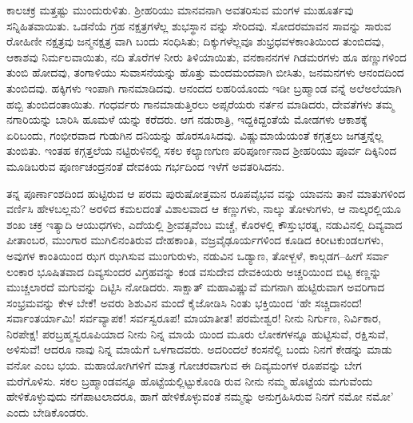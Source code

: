 ಕಾಲಚಕ್ರ ಮತ್ತಷ್ಟು ಮುಂದುರುಳಿತು. ಶ್ರೀಹರಿಯು ಮಾನವನಾಗಿ ಅವತರಿಸುವ ಮಂಗಳ ಮುಹೂರ್ತವು ಸನ್ನಿಹಿತವಾಯಿತು. ಒಡನೆಯೆ ಗ್ರಹ ನಕ್ಷತ್ರಗಳೆಲ್ಲ ಶುಭಸ್ಥಾನ ವನ್ನು ಸೇರಿದವು. ಸೋದರಮಾವನ ಸಾವನ್ನು ಸಾರುವ ರೋಹಿಣೀ ನಕ್ಷತ್ರವು ಜನ್ಮನಕ್ಷತ್ರ ವಾಗಿ ಬಂದು ಸಂಧಿಸಿತು; ದಿಕ್ಕುಗಳೆಲ್ಲವೂ ಶುಭ್ರಧವಳಕಾಂತಿಯಿಂದ ತುಂಬಿದವು, ಆಕಾಶವು ನಿರ್ಮಲವಾಯಿತು, ನದಿ ತೊರೆಗಳ ನೀರು ತಿಳಿಯಾಯಿತು, ವನಕಾನನಗಳ ಗಿಡಮರಗಳು ಹೂ ಹಣ್ಣುಗಳಿಂದ ತುಂಬಿ ಹೋದವು, ತಂಗಾಳಿಯು ಸುವಾಸನೆಯನ್ನು ಹೊತ್ತು ಮಂದಮಂದವಾಗಿ ಬೀಸಿತು, ಜನಮನಗಳು ಆನಂದದಿಂದ ತುಂಬಿದವು. ಹಕ್ಕಿಗಳು ಇಂಪಾಗಿ ಗಾನಮಾಡಿದವು. ಆನಂದದ ಲಹರಿಯೊಂದು ಇಡೀ ಬ್ರಹ್ಮಾಂಡ ವನ್ನೆ ಅಲೆಅಲೆಯಾಗಿ ಹಬ್ಬಿ ತುಂಬಿದಂತಾಯಿತು. ಗಂಧರ್ವರು ಗಾನಮಾಡುತ್ತಿರಲು ಅಪ್ಸರೆಯರು ನರ್ತನ ಮಾಡಿದರು, ದೇವತೆಗಳು ತಮ್ಮ ನಗಾರಿಯನ್ನು ಬಾರಿಸಿ ಹೂಮಳೆ ಯನ್ನು ಕರೆದರು. ಆಗ ನಡುರಾತ್ರಿ, ಇದ್ದಕಿದ್ದಂತೆಯೆ ಮೋಡಗಳು ಆಕಾಶಕ್ಕೆ ಏರಿಬಂದು, ಗಂಭೀರವಾದ ಗುಡುಗಿನ ದನಿಯನ್ನು ಹೊರಸೂಸಿದವು. ವಿಷ್ಣುಮಾಯೆಯಂತೆ ಕಗ್ಗತ್ತಲು ಜಗತ್ತನ್ನೆಲ್ಲ ತುಂಬಿತು. ಇಂತಹ ಕಗ್ಗತ್ತಲೆಯ ನಟ್ಟಿರುಳಿನಲ್ಲಿ ಸಕಲ ಕಲ್ಯಾಣಗುಣ ಪರಿಪೂರ್ಣನಾದ ಶ್ರೀಹರಿಯು ಪೂರ್ವ ದಿಕ್ಕಿನಿಂದ ಮೂಡಿಬರುವ ಪೂರ್ಣಚಂದ್ರನಂತೆ ದೇವಕಿಯ ಗರ್ಭದಿಂದ ಇಳೆಗೆ ಅವತರಿಸಿದನು.

ತನ್ನ ಪೂರ್ಣಾಂಶದಿಂದ ಹುಟ್ಟಿರುವ ಆ ಪರಮ ಪುರುಷೋತ್ತಮನ ರೂಪವೈಭವ ವನ್ನು ಯಾವನು ತಾನೆ ಮಾತುಗಳಿಂದ ವರ್ಣಿಸಿ ಹೇಳಬಲ್ಲನು? ಅರಳಿದ ಕಮಲದಂತೆ ವಿಶಾಲವಾದ ಆ ಕಣ್ಣುಗಳು, ನಾಲ್ಕು ತೋಳುಗಳು, ಆ ನಾಲ್ಕರಲ್ಲಿಯೂ ಶಂಖ ಚಕ್ರ ಇತ್ಯಾದಿ ಆಯುಧಗಳು, ಎದೆಯಲ್ಲಿ ಶ್ರೀವತ್ಸವೆಂಬ ಮಚ್ಚೆ, ಕೊರಳಲ್ಲಿ ಕೌಸ್ತುಭರತ್ನ, ನಡುವಿನಲ್ಲಿ ದಿವ್ಯವಾದ ಪೀತಾಂಬರ, ಮುಂಗಾರ ಮುಗಿಲಿನಂತಿರುವ ದೇಹಕಾಂತಿ, ವಜ್ರವೈಢೂರ್ಯಗಳಿಂದ ಕೂಡಿದ ಕಿರೀಟಕುಂಡಲಗಳು, ಅವುಗಳ ಕಾಂತಿಯಿಂದ ಝಗ ಝಗಿಸುವ ಮುಂಗುರುಳು, ನಡುವಿನ ಒಡ್ಯಾಣ, ತೋಳ್ಬಳೆ, ಕಾಲ್ಗಡಗ–ಹೀಗೆ ಸರ್ವಾ ಲಂಕಾರ ಭೂಷಿತವಾದ ದಿವ್ಯಸುಂದರ ವಿಗ್ರಹವನ್ನು ಕಂಡ ವಸುದೇವ ದೇವಕಿಯರು ಅಚ್ಚರಿಯಿಂದ ಬಿಟ್ಟ ಕಣ್ಣನ್ನು ಮುಚ್ಚಲಾರದೆ ಮಗುವನ್ನು ದಿಟ್ಟಿಸಿ ನೋಡಿದರು. ಸಾಕ್ಷಾತ್ ಮಹಾವಿಷ್ಣುವೆ ಮಗನಾಗಿ ಹುಟ್ಟಿರುವಾಗ ಅವರಿಗಾದ ಸಂಭ್ರಮವನ್ನು ಕೇಳ ಬೇಕೆ! ಅವರು ಶಿಶುವಿನ ಮಂದೆ ಕೈಜೋಡಿಸಿ ನಿಂತು ಭಕ್ತಿಯಿಂದ ‘ಹೇ ಸಚ್ಚಿದಾನಂದ! ಸರ್ವಾಂತರ್ಯಾಮಿ! ಸರ್ವವ್ಯಾಪಕ! ಸರ್ವಸ್ವರೂಪ! ಮಾಯಾತೀತ! ಪರಮೇಶ್ವರ! ನೀನು ನಿರ್ಗುಣ, ನಿರ್ವಿಕಾರ, ನಿರಪೇಕ್ಷ! ಪರಬ್ರಹ್ಮಸ್ವರೂಪಿಯಾದ ನೀನು ನಿನ್ನ ಮಾಯೆ ಯಿಂದ ಮೂರು ಲೋಕಗಳನ್ನೂ ಹುಟ್ಟಿಸುವೆ, ರಕ್ಷಿಸುವೆ, ಅಳಿಸುವೆ! ಆದರೂ ನಾವು ನಿನ್ನ ಮಾಯೆಗೆ ಒಳಗಾದವರು. ಅದರಿಂದಲೆ ಕಂಸನೆಲ್ಲಿ ಬಂದು ನಿನಗೆ ಕೇಡನ್ನು ಮಾಡು ವನೋ ಎಂಬ ಭಯ. ಮಹಾಯೋಗಿಗಳಿಗೆ ಮಾತ್ರ ಗೋಚರವಾಗುವ ಈ ದಿವ್ಯಮಂಗಳ ರೂಪವನ್ನು ಬೇಗ ಮರೆಗೊಳಿಸು. ಸಕಲ ಬ್ರಹ್ಮಾಂಡವನ್ನೂ ಹೊಟ್ಟೆಯಲ್ಲಿಟ್ಟುಕೊಂಡಿ ರುವ ನೀನು ನಮ್ಮ ಹೊಟ್ಟೆಯ ಮಗುವೆಂದು ಹೇಳಿಕೊಳ್ಳುವುದು ನಗೆಪಾಟಲಾದರೂ, ಹಾಗೆ ಹೇಳಿಕೊಳ್ಳುವಂತೆ ನಮ್ಮನ್ನು ಅನುಗ್ರಹಿಸಿರುವ ನಿನಗೆ ನಮೋ ನಮೋ’ ಎಂದು ಬೇಡಿಕೊಂಡರು.

